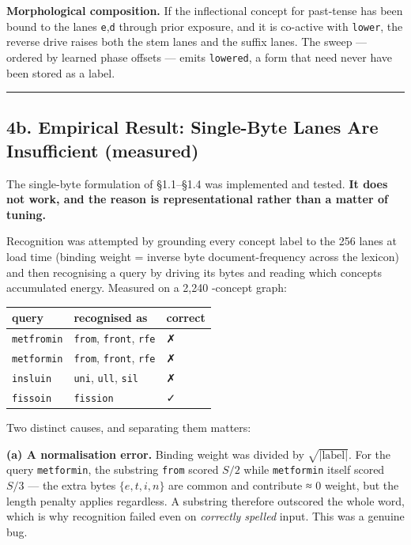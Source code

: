\documentclass[
  11pt,
  a4paper,
]{article}
\begin{document}
\textbf{Morphological composition.} If the inflectional concept for
past-tense has been bound to the lanes \texttt{e},\texttt{d} through
prior exposure, and it is co-active with \texttt{lower}, the reverse
drive raises both the stem lanes and the suffix lanes. The sweep ---
ordered by learned phase offsets --- emits \texttt{lowered}, a form that
need never have been stored as a label.

\begin{center}\rule{0.5\linewidth}{0.5pt}\end{center}

\subsection{4b. Empirical Result: Single-Byte Lanes Are Insufficient
(measured)}\label{b.-empirical-result-single-byte-lanes-are-insufficient-measured}

The single-byte formulation of §1.1--§1.4 was implemented and tested.
\textbf{It does not work, and the reason is representational rather than
a matter of tuning.}

Recognition was attempted by grounding every concept label to the 256
lanes at load time (binding weight = inverse byte document-frequency
across the lexicon) and then recognising a query by driving its bytes
and reading which concepts accumulated energy. Measured on a 2,240
-concept graph:

\begin{longtable}[]{@{}lll@{}}
\toprule\noalign{}
query & recognised as & correct \\
\midrule\noalign{}
\endhead
\bottomrule\noalign{}
\endlastfoot
\texttt{metfromin} & \texttt{from}, \texttt{front}, \texttt{rfe} & ✗ \\
\texttt{metformin} & \texttt{from}, \texttt{front}, \texttt{rfe} & ✗ \\
\texttt{insluin} & \texttt{uni}, \texttt{ull}, \texttt{sil} & ✗ \\
\texttt{fissoin} & \texttt{fission} & ✓ \\
\end{longtable}

Two distinct causes, and separating them matters:

\textbf{(a) A normalisation error.} Binding weight was divided by
\(\sqrt{|\text{label}|}\). For the query \texttt{metformin}, the
substring \texttt{from} scored \(S/2\) while \texttt{metformin} itself
scored \(S/3\) --- the extra bytes \(\{e,t,i,n\}\) are common and
contribute ≈ 0 weight, but the length penalty applies regardless. A
substring therefore outscored the whole word, which is why recognition
failed even on \emph{correctly spelled} input. This was a genuine bug.
\end{document}

